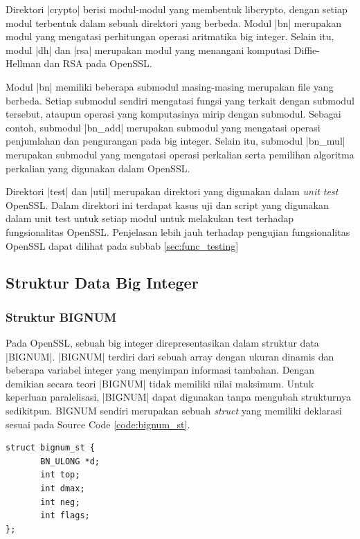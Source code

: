     Direktori |crypto| berisi modul-modul yang membentuk libcrypto, dengan setiap modul terbentuk dalam sebuah direktori yang berbeda. Modul |bn| merupakan modul yang mengatasi perhitungan operasi aritmatika big integer. Selain itu, modul |dh| dan |rsa| merupakan modul yang menangani komputasi Diffie-Hellman dan RSA pada OpenSSL.

    Modul |bn| memiliki beberapa submodul masing-masing merupakan file yang berbeda. Setiap submodul sendiri mengatasi fungsi yang terkait dengan submodul tersebut, ataupun operasi yang komputasinya mirip dengan submodul. Sebagai contoh, submodul |bn_add| merupakan submodul yang mengatasi operasi penjumlahan dan pengurangan pada big integer. Selain itu, submodul |bn_mul| merupakan submodul yang mengatasi operasi perkalian serta pemilihan algoritma perkalian yang digunakan dalam OpenSSL.

    Direktori |test| dan |util| merupakan direktori yang digunakan dalam \textit{unit test} OpenSSL. Dalam direktori ini terdapat kasus uji dan script yang digunakan dalam unit test untuk setiap modul untuk melakukan test terhadap fungsionalitas OpenSSL. Penjelasan lebih jauh terhadap pengujian fungsionalitas OpenSSL dapat dilihat pada subbab \ref{sec:func_testing}

  \subsection{Struktur Data Big Integer} \label{sec:bignum_struct}
  \subsubsection{Struktur BIGNUM}

    Pada OpenSSL, sebuah big integer direpresentasikan dalam struktur data |BIGNUM|. |BIGNUM| terdiri dari sebuah array dengan ukuran dinamis dan beberapa variabel integer yang menyimpan informasi tambahan. Dengan demikian secara teori |BIGNUM| tidak memiliki nilai maksimum. Untuk keperluan paralelisasi, |BIGNUM| dapat digunakan tanpa mengubah strukturnya sedikitpun. BIGNUM sendiri merupakan sebuah \textit{struct} yang memiliki deklarasi sesuai pada Source Code \ref{code:bignum_st}.

    \begin{lstlisting}[caption={Struktur Data bignum}, label={code:bignum_st}]
struct bignum_st {
       BN_ULONG *d;
       int top;
       int dmax;
       int neg;
       int flags;
};
    \end{lstlisting}

